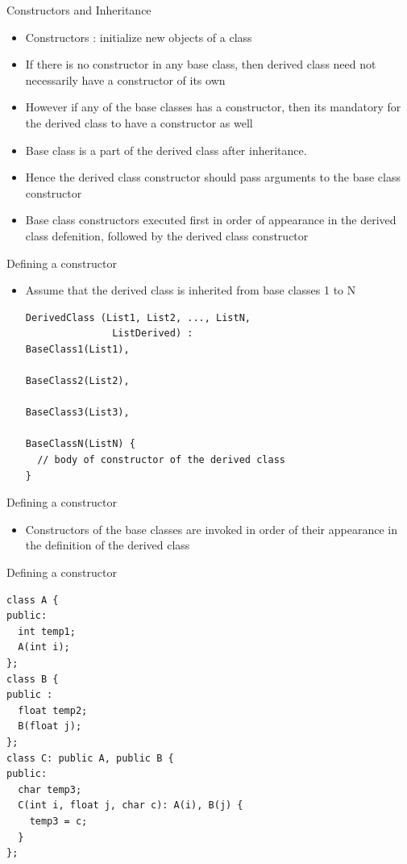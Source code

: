 \documentclass{beamer}
\begin{document}
\begin{frame}[fragile]{Constructors and Inheritance}
  \begin{itemize}
  \item Constructors : initialize new objects of a class\pause
  \item If there is no constructor in any base class, then derived class need not necessarily have a constructor of its own\pause
  \item However if any of the base classes has a constructor, then its mandatory for the derived class to have a constructor as well\pause
  \item Base class is a part of the derived class after inheritance.\pause
  \item Hence the derived class constructor should pass arguments to the base class constructor\pause
  \item Base class constructors executed first in order of appearance in the derived class defenition, followed by the derived class constructor
  \end{itemize}
\end{frame}

\begin{frame}[fragile]{Defining a constructor}
  \begin{itemize}
  \item Assume that the derived class is inherited from base classes 1 to N\pause
    \begin{lstlisting}
DerivedClass (List1, List2, ..., ListN, 
               ListDerived) :
BaseClass1(List1),

BaseClass2(List2),

BaseClass3(List3),

BaseClassN(ListN) {
  // body of constructor of the derived class
}
    \end{lstlisting}
  \end{itemize}
\end{frame}

\begin{frame}[fragile]{Defining a constructor}
  \begin{itemize}
  \item Constructors of the base classes are invoked in order of their appearance in the definition of the derived class
  \end{itemize}
\end{frame}

\begin{frame}[fragile]{Defining a constructor}
  \begin{lstlisting}
class A {
public:
  int temp1;
  A(int i);
};
class B {
public :
  float temp2;
  B(float j);
};
class C: public A, public B {
public:
  char temp3;
  C(int i, float j, char c): A(i), B(j) {
    temp3 = c;
  }
};
  \end{lstlisting}
\end{frame}
\end{document}
